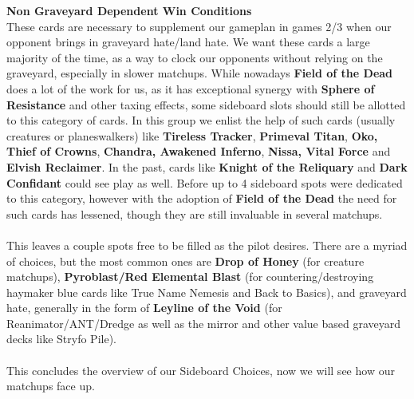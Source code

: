 \documentclass{report}
\begin{document}
\textbf{Non Graveyard Dependent Win Conditions}\\
These cards are necessary to supplement our gameplan in games 2/3 when our opponent brings in graveyard hate/land hate. We want these cards a large majority of the time, as a way to clock our opponents without relying on the graveyard, especially in slower matchups. While nowadays \textbf{Field of the Dead} does a lot of the work for us, as it has exceptional synergy with \textbf{Sphere of Resistance} and other taxing effects, some sideboard slots should still be allotted to this category of cards. In this group we enlist the help of such cards (usually creatures or planeswalkers) like \textbf{Tireless Tracker}, \textbf{Primeval Titan}, \textbf{Oko, Thief of Crowns}, \textbf{Chandra, Awakened Inferno}, \textbf{Nissa, Vital Force} and \textbf{Elvish Reclaimer}. In the past, cards like \textbf{Knight of the Reliquary} and \textbf{Dark Confidant} could see play as well. Before up to 4 sideboard spots were dedicated to this category, however with the adoption of \textbf{Field of the Dead} the need for such cards has lessened, though they are still invaluable in several matchups.\\\\
This leaves a couple spots free to be filled as the pilot desires. There are a myriad of choices, but the most common ones are \textbf{Drop of Honey} (for creature matchups), \textbf{Pyroblast/Red Elemental Blast} (for countering/destroying haymaker blue cards like True Name Nemesis and Back to Basics), and graveyard hate, generally in the form of \textbf{Leyline of the Void} (for Reanimator/ANT/Dredge as well as the mirror and other value based graveyard decks like Stryfo Pile).\\\\
This concludes the overview of our Sideboard Choices, now we will see how our matchups face up.\\
\end{document}
